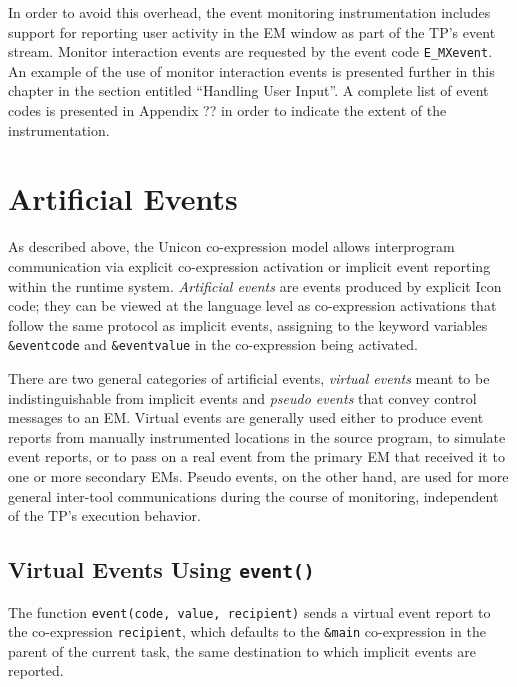 In order to avoid this overhead, the event monitoring instrumentation
includes support for reporting user activity in the EM window as part
of the TP's event stream.
Monitor interaction events are requested by
the event code {\tt E\_MXevent}.  An example of the use of monitor
interaction events is presented further in this chapter in the section
entitled ``Handling User Input''.  A complete list of event codes
is presented in Appendix ?? in order to indicate the extent of the
instrumentation.


\section{Artificial Events}

As described above, the Unicon co-expression model allows
interprogram communication via explicit co-expression activation or
implicit event reporting within the runtime system.
{\em Artificial events\/} are events produced by explicit 
Icon code; they can be viewed at the language level as co-expression
activations that follow the same protocol as implicit events,
assigning to the keyword variables {\tt \&eventcode} and
{\tt \&eventvalue} in the co-expression being activated.

There are two general categories of artificial events, {\em virtual events\/}
meant to be indistinguishable from implicit events and {\em pseudo events\/}
that convey control messages to an EM.  Virtual events are generally
used either to produce event reports from manually instrumented
locations in the source program, to simulate event reports, or to pass
on a real event from the primary EM that received it to one or
more secondary EMs.  Pseudo events, on the other hand, are used for
more general inter-tool communications during the course of monitoring,
independent of the TP's execution behavior.

\subsection*{Virtual Events Using {\tt event()}}

The function {\tt event(code, value, recipient)} sends
a virtual event report to the co-expression {\tt recipient}, which
defaults to the {\tt \&main} co-expression in the parent of the
current task, the same destination to which implicit events are
reported.

